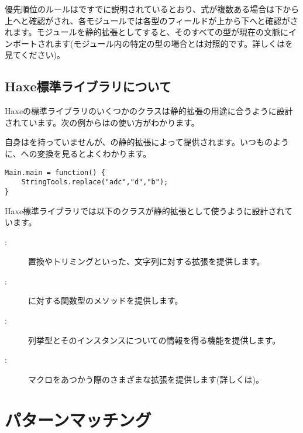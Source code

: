 優先順位のルールはですでに説明されているとおり、式が複数ある場合は下から上へと確認がされ、各モジュールでは各型のフィールドが上から下へと確認がされます。モジュールを静的拡張としてすると、そのすべての型が現在の文脈にインポートされます(モジュール内の特定の型の場合とは対照的です。詳しくはを見てください)。

\subsection{Haxe標準ライブラリについて}
\label{lf-static-extension-in-std}

Haxeの標準ライブラリのいくつかのクラスは静的拡張の用途に合うように設計されています。次の例からはの使い方がわかります。


自身はを持っていませんが、の静的拡張によって提供されます。いつものように、への変換を見るとよくわかります。

\begin{lstlisting}
Main.main = function() {
	StringTools.replace("adc","d","b");
}
\end{lstlisting}

Haxe標準ライブラリでは以下のクラスが静的拡張として使うように設計されています。

\begin{description}
	\item[:] 置換やトリミングといった、文字列に対する拡張を提供します。
	\item[:] に対する関数型のメソッドを提供します。　
	\item[:] 列挙型とそのインスタンスについての情報を得る機能を提供します。
	\item[:] マクロをあつかう際のさまざまな拡張を提供します(詳しくは)。
\end{description}


\section{パターンマッチング}
\label{lf-pattern-matching}

